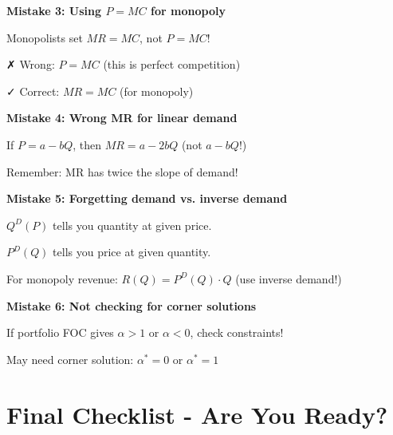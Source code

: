 \documentclass[10pt,letterpaper]{article}
\begin{document}
\begin{warningbox}
\textbf{Mistake 3: Using $P = MC$ for monopoly}

Monopolists set $MR = MC$, not $P = MC$!

✗ Wrong: $P = MC$ (this is perfect competition)

✓ Correct: $MR = MC$ (for monopoly)
\end{warningbox}

\begin{warningbox}
\textbf{Mistake 4: Wrong MR for linear demand}

If $P = a - bQ$, then $MR = a - 2bQ$ (not $a - bQ$!)

Remember: MR has twice the slope of demand!
\end{warningbox}

\begin{warningbox}
\textbf{Mistake 5: Forgetting demand vs. inverse demand}

$Q^D(P)$ tells you quantity at given price.

$P^D(Q)$ tells you price at given quantity.

For monopoly revenue: $R(Q) = P^D(Q) \cdot Q$ (use inverse demand!)
\end{warningbox}

\begin{warningbox}
\textbf{Mistake 6: Not checking for corner solutions}

If portfolio FOC gives $\alpha > 1$ or $\alpha < 0$, check constraints!

May need corner solution: $\alpha^* = 0$ or $\alpha^* = 1$
\end{warningbox}

\newpage

\section*{Final Checklist - Are You Ready?}
\end{document}
